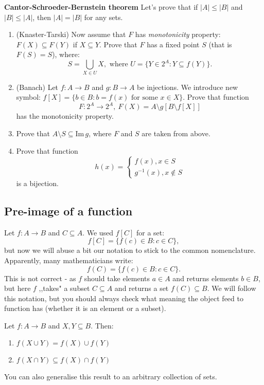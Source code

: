 \begin{prob}
	\textbf{Cantor-Schroeder-Bernstein theorem} Let's prove that if $|A|\le|B|$ and $|B|\le |A|$, then $|A|=|B|$ for any sets.
	\begin{enumerate}
		\item (Knaster-Tarski) Now assume that $F$ has \textit{monotonicity} property: $F(X)\subseteq F(Y)$ if $X\subseteq Y$.
			Prove that $F$ has a fixed point $S$ (that is $F(S)=S$), where:
			$$S=\bigcup_{X\in U} X, \text{~where~} U= \{Y\in 2^A : Y\subseteq f(Y)\}.$$
		\item (Banach) Let $f: A\to B$ and $g:B\to A$ be injections.
			We introduce new symbol: $f[X]=\{b\in B : b=f(x) \text{ for some } x\in X\}$. Prove that
			function $$F:2^A\to 2^A,~F(X)=A\setminus g[B\setminus f[X]]$$
			has the monotonicity property.
    \item Prove that $A\setminus S\subseteq \text{Im}\,g$, where
      $F$ and $S$ are taken from above.
		\item Prove that function
			$$h(x) =
				\begin{cases}
					f(x), x\in S\\
					g^{-1}(x), x \notin S
				\end{cases}
			 $$
			 is a bijection.
	\end{enumerate}
\end{prob}

\subsection{Pre-image of a function}
Let $f:A\to B$ and $C\subseteq A$. We used $f[C]$ for a set:
$$f[C] = \{ f(c) \in B : c\in C\},$$
but now we will abuse a bit our notation to stick to
the common nomenclature. Apparently, many mathematicians write:
$$f(C) = \{ f(c) \in B : c\in C\}.$$
This is not correct - as $f$ should take elements
$a\in A$ and returns elements $b\in B$, but here $f$ ,,takes"
a subset $C\subseteq A$ and returns a set $f(C)\subseteq B$. We will
follow this notation, but you should always check what meaning
the object feed to function has (whether it is an element or a subset).

\begin{prob}
  Let $f:A\to B$ and $X,Y\subseteq B$. Then:
  \begin{enumerate}
    \item $f(X\cup Y)=f(X)\cup f(Y)$
    \item $f(X\cap Y)\subseteq f(X)\cap f(Y)$
  \end{enumerate}
  You can also generalise this result to an arbitrary collection of
  sets.
\end{prob}

